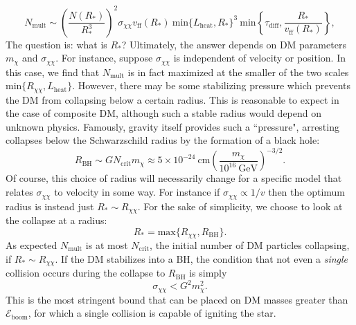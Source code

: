 \documentclass[preprintnumbers,amsmath,amssymb,prd,superscriptaddress]{revtex4}
\newcommand{\Eboom}{\mathcal{E}_\text{boom}}
\newcommand{\GeV}{\text{GeV}}
\newcommand{\cm}{\text{cm}}
\def\r{\right)}
\def\l{\left(}
\begin{document}
\begin{equation}
\label{eq:nmulti}
N_\text{mult} \sim \l \frac{N(R_*)}{R_*^3}\r^2  \sigma_{\chi \chi} v_\text{ff}(R_*) ~\text{min}\{L_\text{heat}, R_*\}^3 ~\text{min}\left \{\tau_\text{diff}, \frac{R_*}{v_\text{ff}(R_*)}\right \},
\end{equation}
The question is: what is $R_*$?
Ultimately, the answer depends on DM parameters $m_\chi$ and $\sigma_{\chi \chi}$. 
For instance, suppose $\sigma_{\chi \chi}$ is independent of velocity or position.
In this case, we find that $N_\text{mult}$ is in fact maximized at the smaller of the two scales $\text{min}\{R_{\chi \chi}, L_\text{heat}\}$. 
However, there may be some stabilizing pressure which prevents the DM from collapsing below a certain radius.
This is reasonable to expect in the case of composite DM, although such a stable radius would depend on unknown physics. 
Famously, gravity itself provides such a ``pressure", arresting collapses below the Schwarzschild radius by the formation of a black hole:
\begin{equation}
R_\text{BH} \sim G N_\text{crit} m_\chi \approx 5 \times 10^{-24} ~\cm \l \frac{m_\chi}{10^{16} ~\GeV} \r^{-3/2}.
\end{equation}
Of course, this choice of radius will necessarily change for a specific model that relates $\sigma_{\chi \chi}$ to velocity in some way. 
For instance if $\sigma_{\chi \chi} \propto 1/v$ then the optimum radius is instead just $R_* \sim R_{\chi \chi}$.
For the sake of simplicity, we choose to look at the collapse at a radius:
\begin{equation}
R_* = \text{max}\{R_{\chi \chi}, R_\text{BH}\}.
\end{equation}
As expected $N_\text{mult}$ is at most $N_\text{crit}$, the initial number of DM particles collapsing, if $R_* \sim R_{\chi \chi}$.  
If the DM stabilizes into a BH, the condition that not even a \emph{single} collision occurs during the collapse to $R_\text{BH}$ is simply
\begin{equation}
\sigma_{\chi \chi} < G^2 m_\chi^2. 
\end{equation}
This is the most stringent bound that can be placed on DM masses greater than $\Eboom$, for which a single collision is capable of igniting the star. 
\end{document}
